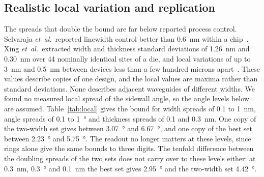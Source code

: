 


\subsection{Realistic local variation and replication}
\label{sec:replication}

The spreads that double the bound are far below reported process control. Selvaraja \textit{et~al.}\ reported
linewidth control better than \qty{0.6}{nm} within a chip~\cite{selvaraja2010}. Xing \textit{et~al.}\ extracted width and thickness
standard deviations of \qty{1.26}{nm} and \qty{0.30}{nm} over 44 nominally identical sites of a die, and local variations
of up to \qty{3}{nm} and \qty{0.5}{nm} between devices less than a few hundred microns apart~\cite{xing2018}. These values describe
copies of one design, and the local values are maxima rather than standard deviations. None describes adjacent waveguides of
different widths. We found no measured local spread of the sidewall angle, so the angle levels below are assumed.
Table~\ref{tab:local} gives the bound for width spreads of 0.1 to \qty{1}{nm}, angle spreads of 0.1 to \qty{1}{\degree} and
thickness spreads of 0.1 and \qty{0.3}{nm}. One copy of the two-width set gives between \qty{3.07}{\degree} and
\qty{6.67}{\degree}, and one copy of the best set between \qty{2.23}{\degree} and \qty{5.75}{\degree}. The readout no longer
matters at these levels, since rings alone give the same bounds to three digits. The tenfold difference
between the doubling spreads of the two sets does not carry over to these levels either: at \qty{0.3}{nm},
\qty{0.3}{\degree} and \qty{0.1}{nm} the best set gives \qty{2.95}{\degree} and the two-width set \qty{4.42}{\degree}.

